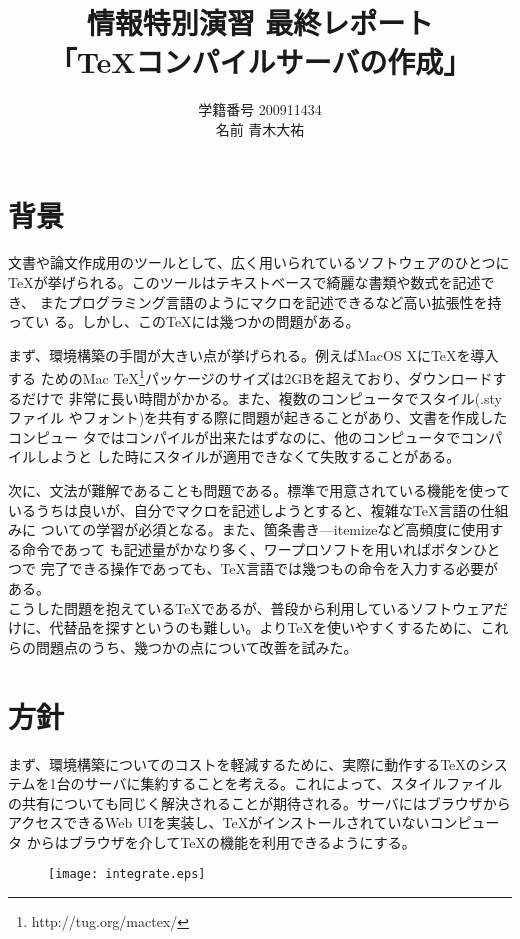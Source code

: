 \documentclass[a4j,9pt,titlepage]{jsarticle}
\title{情報特別演習 最終レポート \\ 「TeXコンパイルサーバの作成」}
\author{学籍番号 200911434 \\ 名前 青木大祐}
\begin{document}
\maketitle
\section{背景}
文書や論文作成用のツールとして、広く用いられているソフトウェアのひとつに
TeXが挙げられる。このツールはテキストベースで綺麗な書類や数式を記述でき、
またプログラミング言語のようにマクロを記述できるなど高い拡張性を持ってい
る。しかし、このTeXには幾つかの問題がある。

まず、環境構築の手間が大きい点が挙げられる。例えばMacOS XにTeXを導入する
ためのMac TeX\footnote{http://tug.org/mactex/}パッケージのサイズは2GBを超えており、ダウンロードするだけで
非常に長い時間がかかる。また、複数のコンピュータでスタイル(.styファイル
やフォント)を共有する際に問題が起きることがあり、文書を作成したコンピュー
タではコンパイルが出来たはずなのに、他のコンピュータでコンパイルしようと
した時にスタイルが適用できなくて失敗することがある。

次に、文法が難解であることも問題である。標準で用意されている機能を使って
いるうちは良いが、自分でマクロを記述しようとすると、複雑なTeX言語の仕組みに
ついての学習が必須となる。また、箇条書き---itemizeなど高頻度に使用する命令であって
も記述量がかなり多く、ワープロソフトを用いればボタンひとつで
完了できる操作であっても、TeX言語では幾つもの命令を入力する必要がある。\\

こうした問題を抱えているTeXであるが、普段から利用しているソフトウェアだ
けに、代替品を探すというのも難しい。よりTeXを使いやすくするために、これ
らの問題点のうち、幾つかの点について改善を試みた。

\section{方針}
まず、環境構築についてのコストを軽減するために、実際に動作するTeXのシス
テムを1台のサーバに集約することを考える。これによって、スタイルファイル
の共有についても同じく解決されることが期待される。サーバにはブラウザから
アクセスできるWeb UIを実装し、TeXがインストールされていないコンピュータ
からはブラウザを介してTeXの機能を利用できるようにする。

\begin{figure}[h]
 \begin{center}
  \texttt{[image: integrate.eps]}
 \end{center}
\end{figure}
\end{document}
